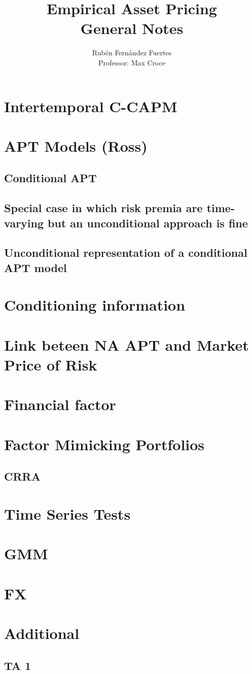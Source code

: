 \documentclass{article}
\author{Rubén Fernández Fuertes \\ Professor: Max Croce}
\title{Empirical Asset Pricing\\ General Notes}
\begin{document}
	
	\maketitle
	\tableofcontents
	\newpage
	
	\section{Intertemporal C-CAPM}
		
	\section{APT Models (Ross)}
		
		\subsection{Conditional APT}
		
		\subsection{Special case in which risk premia are time-varying but an unconditional approach is fine}
		
		\subsection{Unconditional representation of a conditional APT model}
		
	\section{Conditioning information}
		
	\section{Link beteen NA APT and Market Price of Risk}
		
	\section{Financial factor}
		
	\section{Factor Mimicking Portfolios}
		
		\subsection{CRRA}
		
	\section{Time Series Tests}
		
	\section{GMM}
		
	\section{FX}
		
	\newpage
	\section{Additional}
	\subsection{TA 1}
		
\end{document}
